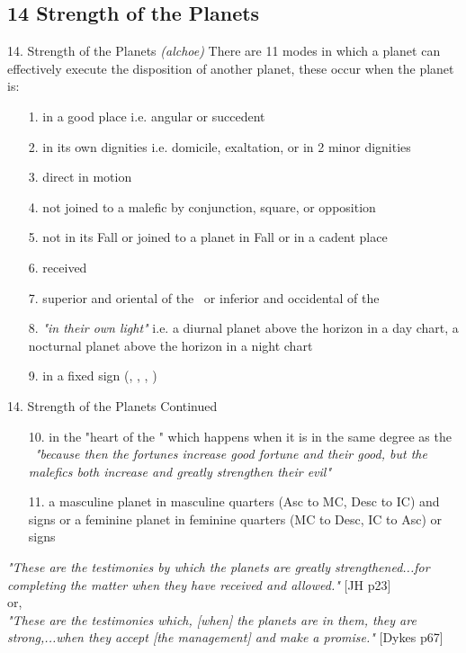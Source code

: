 \subsection{14 Strength of the Planets}
\begin{frame}[t]{14. Strength of the Planets}
\textsl{(alchoe)} There are 11 modes in which a planet can effectively execute the disposition of another planet, these occur when the planet is:
\begin{enumerate}
\item[1.] in a good place i.e. angular or succedent
\item[2.] in its own dignities i.e. domicile, exaltation, or in 2 minor dignities
\item[3.] direct in motion
\item[4.] not joined to a malefic by conjunction, square, or opposition
\item[5.] not in its Fall or joined to a planet in Fall or in a cadent place
\item[6.] received
\item[7.] superior and oriental of the \Sun\ or inferior and occidental of the \Sun
\item[8.] \textsl{"in their own light"} i.e. a diurnal planet above the horizon in a day chart, a nocturnal planet above the horizon in a night chart
\item[9.] in a fixed sign (\Taurus, \Leo, \Scorpio, \Aquarius)
\end{enumerate}
\end{frame}
\begin{frame}[t]{14. Strength of the Planets Continued}
\begin{enumerate}
\item[10.] in the "heart of the \Sun" which happens when it is in the same degree as the \Sun\ \textsl{"because then the fortunes increase good fortune and their good, but the malefics both increase and greatly strengthen their evil"}\footnotemark[1]

\item[11.] a masculine planet in masculine quarters (Asc to MC, Desc to IC) and signs or a feminine planet in feminine quarters (MC to Desc, IC to Asc) or signs
\end{enumerate}
\textsl{"These are the testimonies by which the planets are greatly strengthened...for completing the matter when they have received and allowed."} [JH p23] \\ 
or, \\
\textsl{"These are the testimonies which, [when] the planets are in them, they are strong,...when they accept [the management] and make a promise."} [Dykes p67]


\end{frame}
